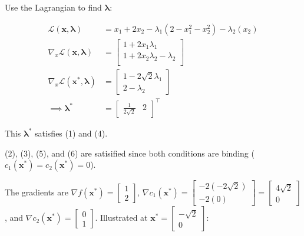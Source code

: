 Use the Lagrangian to find $\mathbf{\lambda}$:

\begin{align*}
  \mathcal{L}(\mathbf{x, \lambda})             & = x_1 + 2x_2 - \lambda_1(2-x_1^2 - x_2^2) - \lambda_2(x_2) \\
  \nabla _x \mathcal{L}(\mathbf{x, \lambda})   & =
  \begin{bmatrix}
    1 + 2x_1\lambda_1            \\
    1 + 2x_2\lambda_2 -\lambda_2 \\
  \end{bmatrix}                                                                              \\
  \nabla _x \mathcal{L}(\mathbf{x^*, \lambda}) & =
  \begin{bmatrix}
    1 - 2\sqrt{2}\lambda_1 \\
    2 - \lambda_2
  \end{bmatrix}                                                                                    \\
  \implies \mathbf{\lambda^*}                  & = \begin{bmatrix}
                                                     \frac{1}{2\sqrt{2}} & 2
                                                   \end{bmatrix}^{\top}
\end{align*}

This $\mathbf{\lambda^*}$ satisfies (1) and (4).

(2), (3), (5), and (6) are satisified since both conditions are binding ($c_1(\mathbf{x^*}) = c_2(\mathbf{x^*}) = 0$).



The gradients are $\nabla f(\mathbf{x^*}) =
  \begin{bmatrix}
    1 \\ 2
  \end{bmatrix}$, $\nabla c_1(\mathbf{x^*}) =
  \begin{bmatrix}
    -2(-2\sqrt{2}) \\ -2(0)
  \end{bmatrix} =
  \begin{bmatrix}
    4\sqrt{2} \\ 0
  \end{bmatrix}$,
and
$\nabla c_2(\mathbf{x^*}) =
  \begin{bmatrix}
    0 \\ 1
  \end{bmatrix}$. Illustrated at $\mathbf{x^*} = \begin{bmatrix}
    -\sqrt{2} \\ 0
  \end{bmatrix}$:

